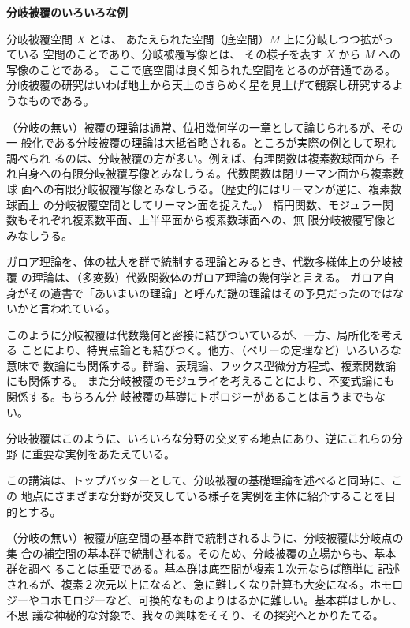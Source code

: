 \documentclass[uplatex,dvipdfmx]{jlreq}
\begin{document}
\begin{center}
{\Large\bfseries 分岐被覆のいろいろな例}

\hspace*{\fill}{\large\bfseries 難波 誠（阪大・理）}
\end{center}

\bigskip

分岐被覆空間 $X$ とは、
あたえられた空間（底空間）$M$ 上に分岐しつつ拡がっている
空間のことであり、分岐被覆写像とは、
その様子を表す $X$ から $M$ への写像のことである。
ここで底空間は良く知られた空間をとるのが普通である。
分岐被覆の研究はいわば地上から天上のきらめく星を見上げて観察し研究するようなものである。

（分岐の無い）被覆の理論は通常、位相幾何学の一章として論じられるが、その一
般化である分岐被覆の理論は大抵省略される。ところが実際の例として現れ調べられ
るのは、分岐被覆の方が多い。例えば、有理関数は複素数球面から
それ自身への有限分岐被覆写像とみなしうる。代数関数は閉リーマン面から複素数球
面への有限分岐被覆写像とみなしうる。（歴史的にはリーマンが逆に、複素数球面上
の分岐被覆空間としてリーマン面を捉えた。）
楕円関数、モジュラー関数もそれぞれ複素数平面、上半平面から複素数球面への、無
限分岐被覆写像とみなしうる。

ガロア理論を、体の拡大を群で統制する理論とみるとき、代数多様体上の分岐被覆
の理論は、（多変数）代数関数体のガロア理論の幾何学と言える。
ガロア自身がその遺書で「あいまいの理論」と呼んだ謎の理論はその予見だったのではないかと言われている。

このように分岐被覆は代数幾何と密接に結びついているが、一方、局所化を考える
ことにより、特異点論とも結びつく。他方、（ベリーの定理など）いろいろな意味で
数論にも関係する。群論、表現論、フックス型微分方程式、複素関数論にも関係する。
また分岐被覆のモジュライを考えることにより、不変式論にも関係する。もちろん分
岐被覆の基礎にトポロジーがあることは言うまでもない。

分岐被覆はこのように、いろいろな分野の交叉する地点にあり、逆にこれらの分野
に重要な実例をあたえている。

この講演は、トップバッターとして、分岐被覆の基礎理論を述べると同時に、この
地点にさまざまな分野が交叉している様子を実例を主体に紹介することを目的とする。

（分岐の無い）被覆が底空間の基本群で統制されるように、分岐被覆は分岐点の集
合の補空間の基本群で統制される。そのため、分岐被覆の立場からも、基本群を調べ
ることは重要である。基本群は底空間が複素１次元ならば簡単に
記述されるが、複素２次元以上になると、急に難しくなり計算も大変になる。ホモロ
ジーやコホモロジーなど、可換的なものよりはるかに難しい。基本群はしかし、不思
議な神秘的な対象で、我々の興味をそそり、その探究へとかりたてる。
\end{document}

